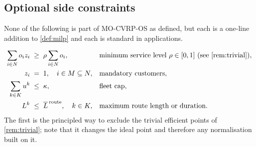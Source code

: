 \documentclass[11pt,a4paper]{article}
\theoremstyle{definition}
\theoremstyle{plain}
\newcommand{\Cust}{N}
\newcommand{\Veh}{K}
\begin{document}
\subsection{Optional side constraints}
\label{sec:alt-side}

None of the following is part of \textup{\textsc{MO-CVRP-OS}} as defined, but each is a
one-line addition to \cref{def:milp} and each is standard in applications.

\begin{align}
  \sum_{i \in \Cust} o_i z_i &\;\ge\; \rho \sum_{i \in \Cust} o_i,
  & &\text{minimum service level } \rho \in [0,1]
  \text{ (see \cref{rem:trivial})}, \\
  z_i &\;=\; 1, \quad i \in M \subseteq \Cust,
  & &\text{mandatory customers}, \\
  \sum_{k \in \Veh} u^k &\;\le\; \kappa,
  & &\text{fleet cap}, \\
  L^k &\;\le\; \overline{L}^{\,\mathrm{route}}, \quad k \in \Veh,
  & &\text{maximum route length or duration}.
\end{align}
The first is the principled way to exclude the trivial efficient points of
\cref{rem:trivial}; note that it changes the ideal point and therefore any
normalisation built on it.



\end{document}
